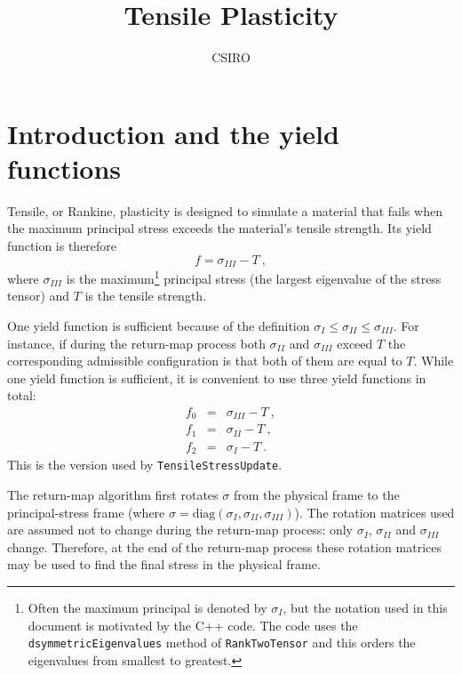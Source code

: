 \documentclass[]{scrreprt}
\begin{document}
\title{Tensile Plasticity}
\author{CSIRO}
\maketitle

\tableofcontents


\chapter{Introduction and the yield functions}
\label{yf.chap}

Tensile, or Rankine, plasticity is designed to simulate a material
that fails when the maximum principal stress exceeds the material's tensile
  strength.  Its yield function is therefore
\begin{equation}
  f =  \sigma_{III} - T \ ,
\end{equation}
where $\sigma_{III}$ is the maximum\footnote{Often the maximum
  principal is denoted by $\sigma_{I}$, but the notation used in this
  document is motivated by the C++ code.  The code uses the {\tt
    dsymmetricEigenvalues} method of {\tt RankTwoTensor} and this
  orders the eigenvalues from smallest to greatest.} principal
stress (the largest eigenvalue of the stress tensor) and $T$ is the
tensile strength.

One yield function is sufficient because of the definition
$\sigma_{I}\leq\sigma_{II}\leq\sigma_{III}$.  For instance, if during
the return-map process both $\sigma_{II}$ and $\sigma_{III}$ exceed
$T$ the corresponding admissible configuration is that both of them
are equal to $T$.  While one yield function is sufficient, it is
convenient to use three yield functions in total:
\begin{eqnarray}
  f_{0} & = & \sigma_{III} - T \ , \nonumber \\
  f_{1} & = & \sigma_{II} - T \ , \nonumber \\
  f_{2} & = & \sigma_{I} - T \ .
  \label{yfs}
\end{eqnarray}
This is the version used by {\tt TensileStressUpdate}.

The return-map algorithm first rotates $\sigma$ from the physical
frame to the
principal-stress frame (where $\sigma = \mbox{diag}(\sigma_{I}, \sigma_{II},
\sigma_{III})$).  The rotation matrices used are assumed not to change
during the return-map process: only $\sigma_{I}$, $\sigma_{II}$ and
$\sigma_{III}$ change.  Therefore, at the end of the
return-map process these rotation matrices may be used to find the
final stress in the physical frame.
\end{document}
